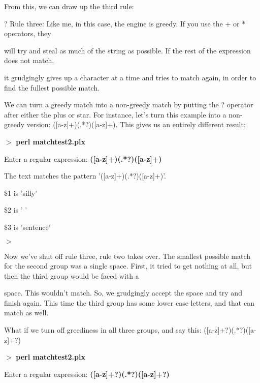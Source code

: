 \documentclass[a4paper,11pt]{book}
\begin{document}
\noindent From this, we can draw up the third rule:

\noindent 

\noindent ? Rule  three: Like me, in this case, the engine is greedy. If you use the + or * operators, they

\noindent will try and steal as much of the string as possible. If the rest of the expression does not match,

\noindent it grudgingly gives up a character at a time and tries to match again, in order to find the fullest possible match.

\noindent 

\noindent 

\noindent We can turn a greedy match into a non-greedy match by putting the ? operator after either the plus or star. For instance, let's turn this example into a non-greedy version: ([a-z]+)(.*?)([a-z]+). This gives us an entirely different result:

\noindent 

\noindent 

\noindent $>$ \textbf{perl matchtest2.plx}

\noindent Enter a regular expression: \textbf{([a-z]+)(.*?)([a-z]+)}

\noindent The text matches the pattern '([a-z]+)(.*?)([a-z]+)'.

\noindent \$1 is 'silly'

\noindent \$2 is ' '

\noindent \$3 is 'sentence'

\noindent $>$

\noindent 

\noindent Now we've shut off rule three, rule two takes over. The smallest possible match for the second group was a single space. First, it tried to get nothing at all, but then the third group would be faced with a

\noindent space. This wouldn't match. So, we grudgingly accept the space and try and finish again. This time the third group has some lower case letters, and that can match as well.

\noindent 

\noindent What if we turn off greediness in all three groups, and say this: ([a-z]+?)(.*?)([a-z]+?)

\noindent 

\noindent $>$ \textbf{perl matchtest2.plx}

\noindent Enter a regular expression: \textbf{([a-z]+?)(.*?)([a-z]+?)}
\end{document}
